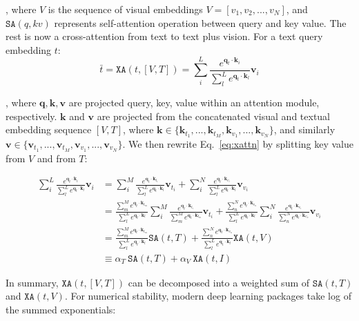 , where $V$ is the sequence of visual embeddings $V=[v_1, v_2, ..., v_N]$, and $\texttt{SA}(q, kv)$ represents self-attention operation between query and key value.
The rest is now a cross-attention from text to text plus vision.
For a text query embedding $t$:
\begin{equation}
\bar{t} = \texttt{XA}(t, [V, T]) = \sum_{i}^{L} \frac{e^{\bm{q}_t\cdot \bm{k}_{i}}}{\sum_{l}^{L} e^{\bm{q}_{t}\cdot \bm{k}_{l}}}\bm{v}_{i} \label{eq:xattn}
\end{equation}

, where $\bm{q}, \bm{k}, \bm{v}$ are projected query, key, value within an attention module, respectively.
$\bm{k}$ and $\bm{v}$ are projected from the concatenated visual and textual embedding sequence $[V, T]$, where $\bm{k} \in \{\bm{k}_{t_1},...,\bm{k}_{t_M},\bm{k}_{v_1},...,\bm{k}_{v_N}\}$, and similarly $\bm{v} \in \{\bm{v}_{t_1},...,\bm{v}_{t_M},\bm{v}_{v_1},...,\bm{v}_{v_N}\}$.
We then rewrite Eq.~\ref{eq:xattn} by splitting key value from $V$ and from $T$:

\begin{align}
\sum_{i}^{L} \frac{e^{\bm{q}_t\cdot \bm{k}_{i}}}{\sum_{l}^{L} e^{\bm{q}_{t}\cdot \bm{k}_{l}}}\bm{v}_{i}
&= \sum_{i}^{M} \frac{e^{\bm{q}_t\cdot \bm{k}_{t_i}}}{\sum_{l}^{L} e^{\bm{q}_{t}\cdot \bm{k}_{l}}}\bm{v}_{t_i} +
\sum_{i}^{N} \frac{e^{\bm{q}_t\cdot \bm{k}_{v_i}}}{\sum_{l}^{L} e^{\bm{q}_{t}\cdot \bm{k}_{l}}}\bm{v}_{v_i}\\
&= \frac{\sum_{m}^{M} e^{\bm{q}_{t}\cdot \bm{k}_{t_m}}}{\sum_{l}^{L} e^{\bm{q}_{t}\cdot \bm{k}_{l}}} \sum_{i}^{M} \frac{e^{\bm{q}_t\cdot \bm{k}_{t_i}}}{\sum_{m}^{M} e^{\bm{q}_{t}\cdot \bm{k}_{t_m}}}\bm{v}_{t_i} +
\frac{\sum_{n}^{N} e^{\bm{q}_{t}\cdot \bm{k}_{v_n}}}{\sum_{l}^{L} e^{\bm{q}_{t}\cdot \bm{k}_{l}}} \sum_{i}^{N} \frac{e^{\bm{q}_t\cdot \bm{k}_{v_i}}}{\sum_{n}^{N} e^{\bm{q}_{t}\cdot \bm{k}_{v_n}}}\bm{v}_{v_i}\\
&= \frac{\sum_{m}^{M} e^{\bm{q}_{t}\cdot \bm{k}_{t_m}}}{\sum_{l}^{L} e^{\bm{q}_{t}\cdot \bm{k}_{l}}} \texttt{SA}(t,T) +
\frac{\sum_{n}^{N} e^{\bm{q}_{t}\cdot \bm{k}_{v_n}}}{\sum_{l}^{L} e^{\bm{q}_{t}\cdot \bm{k}_{l}}} \texttt{XA}(t,V) \\
&\equiv \alpha_T\ \texttt{SA}(t,T) + \alpha_V\ \texttt{XA}(t, I)\label{eq:dattn}
\end{align}

In summary, $\texttt{XA}(t, [V, T])$ can be decomposed into a weighted sum of $\texttt{SA}(t, T)$ and $\texttt{XA}(t, V)$.
For numerical stability, modern deep learning packages take log of the summed exponentials:

